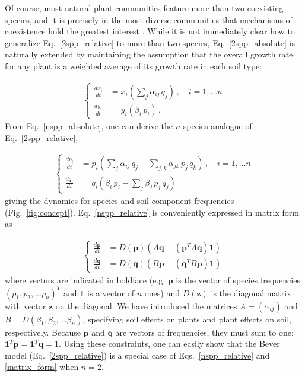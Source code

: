 \documentclass[11pt]{article}
\begin{document}
Of course, most natural plant communities feature more than two coexisting species, and it is precisely in the most diverse communities that mechanisms of coexistence hold the greatest interest \citep{van2013plant}. While it is not immediately clear how to generalize Eq.~\ref{2spp_relative} to more than two species, Eq.~\ref{2spp_absolute} is naturally extended by maintaining the assumption that the overall growth rate for any plant is a weighted average of its growth rate in each soil type:

\begin{align} \label{nspp_absolute}
\begin{cases}
\frac{dx_i}{dt} &= x_i \left(\sum_{j} \alpha_{ij} \, q_j \right) \, , \quad  i = 1, \dots n \\
\frac{dy_i}{dt} &= y_i \left( \beta_i \, p_i \right) \, .
\end{cases}
\end{align}
From Eq.~\ref{nspp_absolute}, one can derive the $n$-species analogue of Eq.~\ref{2spp_relative},

\begin{align} \label{nspp_relative}
\begin{cases}
\frac{dp_i}{dt} &= p_i \left(\sum_{j} \alpha_{ij} \, q_j - \sum_{j, k} \alpha_{jk} \, p_j \, q_k \right) \, , \quad  i = 1, \dots n \\
\frac{dq_i}{dt} &= q_i \left(\beta_{i} \, p_i - \sum_{j} \beta_{j} \, p_j \, q_j  \right) \,
\end{cases}
\end{align}
giving the dynamics for species and soil component frequencies (Fig.~\ref{fig:concept}). Eq.~\ref{nspp_relative} is conveniently expressed in matrix form as

\begin{align} \label{matrix_form}
\begin{cases}
\frac{d\bm{p}}{dt} &= D(\bm{p}) \left(A \bm{q} - (\bm{p}^T A \bm{q}) \bm{1} \right) \\
\frac{d\bm{q}}{dt} &= D(\bm{q}) \left(B \bm{p} - (\bm{q}^T B \bm{p}) \bm{1}  \right) \,
\end{cases}
\end{align}
where vectors are indicated in boldface (e.g. $\bm{p}$ is the vector of species frequencies $(p_1, p_2, \dots p_n)^T$ and $\bm{1}$ is a vector of $n$ ones) and $D(\bm{z})$ is the diagonal matrix with vector $\bm{z}$ on the diagonal. We have introduced the matrices $A = (\alpha_{ij})$ and $B = D(\beta_1, \beta_2, \dots \beta_n)$, specifying soil effects on plants and plant effects on soil, respectively. Because $\bm{p}$ and $\bm{q}$ are vectors of frequencies, they must sum to one: $\bm{1}^T \bm{p} = \bm{1}^T \bm{q} = 1$. Using these constraints, one can easily show that the Bever model (Eq.~\ref{2spp_relative}) is a special case of Eqs.~\ref{nspp_relative} and \ref{matrix_form} when $n = 2$.
\end{document}

